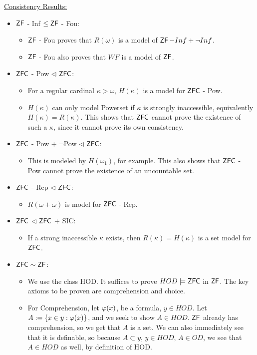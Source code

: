 \documentclass{amsart}
\DeclareMathOperator{\ZFC}{\sf{ZFC}}
\DeclareMathOperator{\ZF}{\sf{ZF}}
\begin{document}
	\underline{Consistency Results:}
	\begin{itemize}
		\item $\ZF$ - Inf $\leq \ZF$ - Fou:
		\begin{itemize}
			\item $\ZF$ - Fou proves that $R(\omega)$ is a model of $\ZF - Inf + \neg Inf$.
			\item $\ZF$ - Fou also proves that $WF$ is a model of $\ZF$.
		\end{itemize}
		\item $\ZFC$ - Pow $\lhd$ $\ZFC$: 
		\begin{itemize}
			\item For a regular cardinal $\kappa>\omega$, $H(\kappa)$ is a model for $\ZFC$ - Pow. 
			\item $H(\kappa)$ can only model Powerset if $\kappa$ is strongly inaccessible, equivalently $H(\kappa)=R(\kappa)$. This shows that $\ZFC$ cannot prove the existence of such a $\kappa$, since it cannot prove its own consistency.
		\end{itemize}
		\item $\ZFC$ - Pow + $\neg$Pow $\lhd$ $\ZFC$:
		\begin{itemize}
			\item This is modeled by $H(\omega_1)$, for example. This also shows that $\ZFC$ - Pow cannot prove the existence of an uncountable set.
		\end{itemize}
		\item $\ZFC$ - Rep $\lhd$ $\ZFC$:
		\begin{itemize}
			\item $R(\omega+\omega)$ is model for $\ZFC$ - Rep.
		\end{itemize}
		\item $\ZFC$ $\lhd$ $\ZFC$ + SIC:
		\begin{itemize}
			\item If a strong inaccessible $\kappa$ exists, then $R(\kappa)=H(\kappa)$ is a set model for $\ZFC$.
		\end{itemize}
		\item $\ZFC\sim \ZF$:
		\begin{itemize}
			\item We use the class HOD. It suffices to prove $HOD\models \ZFC$ in $\ZF$. The key axioms to be proven are comprehension and choice. 
			\item For Comprehension, let $\varphi(x)$, be a formula, $y\in HOD$. Let $A := \{x\in y:\varphi(x)\}$, and we seek to show $A\in HOD$. $\ZF$ already has comprehension, so we get that $A$ is a set. We can also immediately see that it is definable, so because $A\subset y$, $y\in HOD$, $A\in OD$, we see that $A\in HOD$ as well, by definition of HOD.

\end{itemize}
\end{itemize}
\end{document}
